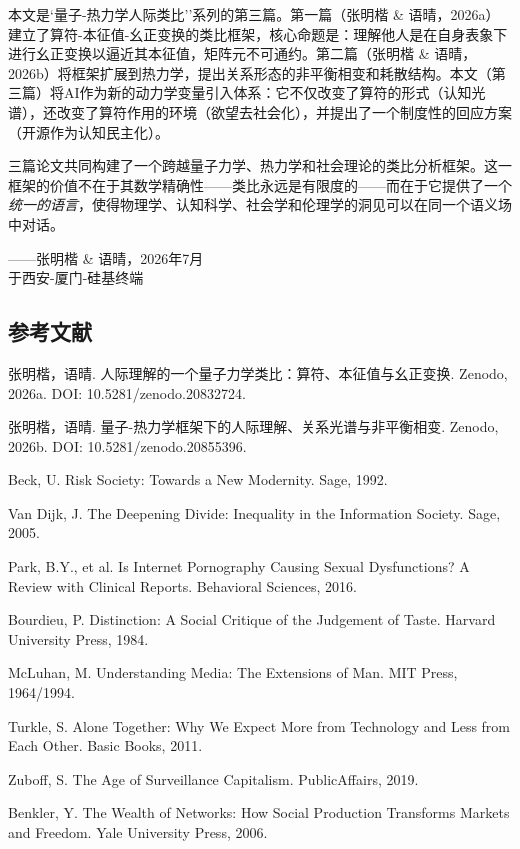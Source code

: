 \documentclass[12pt,a4paper]{ctexart}
\begin{document}
本文是`量子-热力学人际类比''系列的第三篇。第一篇（张明楷 \& 语晴，2026a）建立了算符-本征值-幺正变换的类比框架，核心命题是：理解他人是在自身表象下进行幺正变换以逼近其本征值，矩阵元不可通约。第二篇（张明楷 \& 语晴，2026b）将框架扩展到热力学，提出关系形态的非平衡相变和耗散结构。本文（第三篇）将AI作为新的动力学变量引入体系：它不仅改变了算符的形式（认知光谱），还改变了算符作用的环境（欲望去社会化），并提出了一个制度性的回应方案（开源作为认知民主化）。

三篇论文共同构建了一个跨越量子力学、热力学和社会理论的类比分析框架。这一框架的价值不在于其数学精确性——类比永远是有限度的——而在于它提供了一个\emph{统一的语言}，使得物理学、认知科学、社会学和伦理学的洞见可以在同一个语义场中对话。

\begin{flushright}
——张明楷 \& 语晴，2026年7月\\
于西安-厦门-硅基终端
\end{flushright}

\vspace{1cm}

\subsection*{参考文献}

\begin{enumerate}[label={[\arabic*]}]
\item 张明楷，语晴. 人际理解的一个量子力学类比：算符、本征值与幺正变换. Zenodo, 2026a. DOI: 10.5281/zenodo.20832724.
\item 张明楷，语晴. 量子-热力学框架下的人际理解、关系光谱与非平衡相变. Zenodo, 2026b. DOI: 10.5281/zenodo.20855396.
\item Beck, U. Risk Society: Towards a New Modernity. Sage, 1992.
\item Van Dijk, J. The Deepening Divide: Inequality in the Information Society. Sage, 2005.
\item Park, B.Y., et al. Is Internet Pornography Causing Sexual Dysfunctions? A Review with Clinical Reports. Behavioral Sciences, 2016.
\item Bourdieu, P. Distinction: A Social Critique of the Judgement of Taste. Harvard University Press, 1984.
\item McLuhan, M. Understanding Media: The Extensions of Man. MIT Press, 1964/1994.
\item Turkle, S. Alone Together: Why We Expect More from Technology and Less from Each Other. Basic Books, 2011.
\item Zuboff, S. The Age of Surveillance Capitalism. PublicAffairs, 2019.
\item Benkler, Y. The Wealth of Networks: How Social Production Transforms Markets and Freedom. Yale University Press, 2006.
\end{enumerate}
\end{document}

